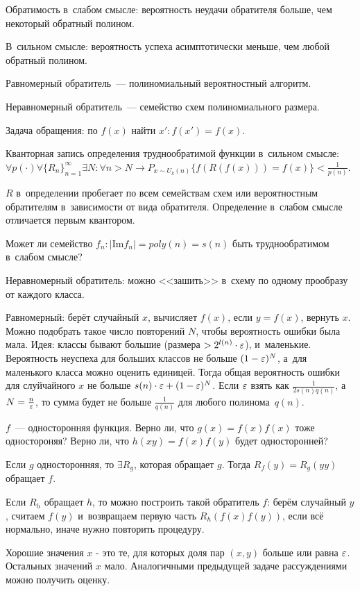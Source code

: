 \documentclass{article}
\begin{document}
Обратимость в~слабом смысле: вероятность неудачи обратителя больше, чем
некоторый обратный полином.

В~сильном смысле: вероятность успеха асимптотически меньше, чем любой обратный
полином.

Равномерный обратитель~--- полиномиальный вероятностный алгоритм.

Неравномерный обратитель~--- семейство схем полиномиального размера.

Задача обращения: по $f(x)$ найти $x': f(x') = f(x)$.

Кванторная запись определения труднообратимой функции в~сильном смысле: $\forall
p(\cdot) \forall \{R_n\}_{n=1}^{\infty} \exists N: \forall n > N \rightarrow
P_{x \sim U_k(n)} \{ f(R(f(x))) = f(x) \} < \frac{1}{p(n)}$.

$R$ в~определении пробегает по всем семействам схем или вероятностным
обратителям в~зависимости от вида обратителя. Определение в~слабом смысле
отличается первым квантором.

\begin{problem}
	Может ли семейство $f_n: |\text{Im} f_n| = poly(n) = s(n)$ быть труднообратимом
	в~слабом смысле?

	Неравномерный обратитель: можно <<зашить>> в~схему по одному прообразу от
	каждого класса.

	Равномерный: берёт случайный $x$, вычисляет $f(x)$, если $y = f(x)$, вернуть
	$x$. Можно подобрать такое число повторений $N$, чтобы вероятность ошибки была
	мала. Идея: классы бывают большие (размера $> 2^{l(n)} \cdot \varepsilon$),
	и~маленькие. Вероятность неуспеха для больших классов не больше $(1 -
	\varepsilon)^N$, а~для маленького класса можно оценить единицей. Тогда общая
	вероятность ошибки для слуйчайного $x$ не больше $s(n) \cdot \varepsilon + (1 -
	\varepsilon)^N$. Если $\varepsilon$ взять как $\frac{1}{2s(n)q(n)}$, а~$N = \frac{n}{\varepsilon}$,
	то сумма будет не больше $\frac{1}{q(n)}$ для любого полинома~$q(n)$.
\end{problem}
\begin{problem}
	$f$~--- односторонняя функция. Верно ли, что $g(x) = f(x)f(x)$ тоже
	одностороняя? Верно ли, что $h(x y) = f(x)f(y)$ будет односторонней?

	Если $g$ односторонняя, то $\exists R_g$, которая обращает $g$. Тогда $R_f(y) =
	R_g(yy)$ обращает $f$.

	Если $R_h$ обращает $h$, то можно построить такой обратитель $f$: берём
	случайный $y$, считаем $f(y)$ и~возвращаем первую часть $R_h(f(x)f(y))$, если
	всё нормально, иначе нужно повторить процедуру.

	Хорошие значения $x$ - это те, для которых доля пар $(x, y)$ больше или равна
	$\varepsilon$. Остальных значений $x$ мало. Аналогичными предыдущей задаче
	рассуждениями можно получить оценку.

\end{problem}
\end{document}
